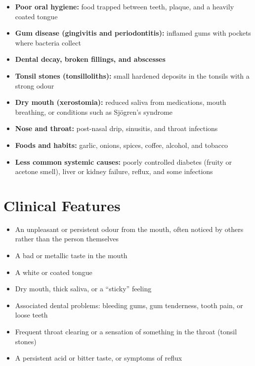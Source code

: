 \begin{itemize}
    \item \textbf{Poor oral hygiene:} food trapped between teeth, plaque, and a heavily coated tongue
    \item \textbf{Gum disease (gingivitis and periodontitis):} inflamed gums with pockets where bacteria collect
    \item \textbf{Dental decay, broken fillings, and abscesses}
    \item \textbf{Tonsil stones (tonsilloliths):} small hardened deposits in the tonsils with a strong odour
    \item \textbf{Dry mouth (xerostomia):} reduced saliva from medications, mouth breathing, or conditions such as Sj\"ogren's syndrome
    \item \textbf{Nose and throat:} post-nasal drip, sinusitis, and throat infections
    \item \textbf{Foods and habits:} garlic, onions, spices, coffee, alcohol, and tobacco
    \item \textbf{Less common systemic causes:} poorly controlled diabetes (fruity or acetone smell), liver or kidney failure, reflux, and some infections
\end{itemize}

\section*{Clinical Features}
\begin{itemize}
    \item An unpleasant or persistent odour from the mouth, often noticed by others rather than the person themselves
    \item A bad or metallic taste in the mouth
    \item A white or coated tongue
    \item Dry mouth, thick saliva, or a ``sticky'' feeling
    \item Associated dental problems: bleeding gums, gum tenderness, tooth pain, or loose teeth
    \item Frequent throat clearing or a sensation of something in the throat (tonsil stones)
    \item A persistent acid or bitter taste, or symptoms of reflux
\end{itemize}


